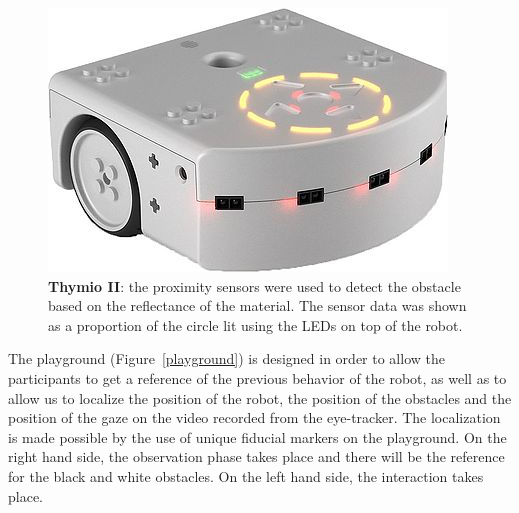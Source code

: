 \documentclass{sig-alternate}
\begin{document}
\begin{figure}
    \centering
    \includegraphics[width=0.9\linewidth]{thymio0}
    \caption{\small \textbf{Thymio II}: the proximity sensors were used to
    detect the obstacle based on the reflectance of the material. The sensor
    data was shown as a proportion of the circle lit using the LEDs on top of the
    robot.}

    \label{thymio}
\end{figure}

The playground (Figure~\ref{playground}) is designed in order to allow the
participants to get a reference of the previous behavior of the robot, as well
as to allow us to localize the position of the robot, the position of the
obstacles and the position of the gaze on the video recorded from the
eye-tracker. The localization is made possible by the use of unique fiducial
markers on the playground. On the right hand side, the observation phase takes
place and there will be the reference for the black and white obstacles. On the
left hand side, the interaction takes place.
\end{document}
